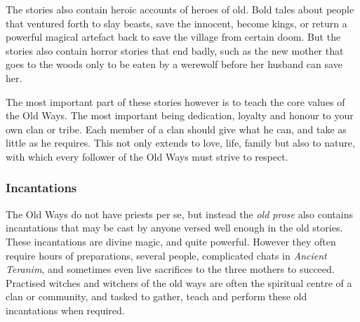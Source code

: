 The stories also contain heroic accounts of heroes of old. Bold tales about
people that ventured forth to slay beasts, save the innocent, become kings, or
return a powerful magical artefact back to save the village from certain doom.
But the stories also contain horror stories that end badly, such as the new
mother that goes to the woods only to be eaten by a werewolf before her
husband can save her.

The most important part of these stories however is to teach the core values of
the Old Ways. The most important being dedication, loyalty and honour to your
own clan or tribe. Each member of a clan should give what he can, and take as
little as he requires. This not only extends to love, life, family but also
to nature, with which every follower of the Old Ways must strive to respect.

\subsubsection*{Incantations}

The Old Ways do not have priests per se, but instead the \emph{old prose} also
contains incantations that may be cast by anyone versed well enough in the
old stories. These incantations are divine magic, and quite powerful. However
they often require hours of preparations, several people, complicated chats in
\emph{Ancient Teranim}, and sometimes even live sacrifices to the three
mothers to succeed. Practised witches and witchers of the old ways are often
the spiritual centre of a clan or community, and tasked to gather, teach and
perform these old incantations when required.
